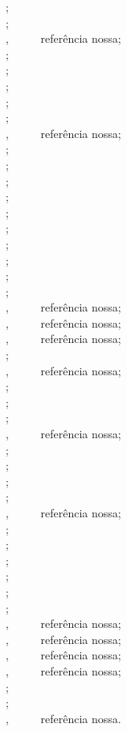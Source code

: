 \begin{apendicesenv}
{\small
	\cite{Alcionep1988} ;\\
	\cite{bart1952} ;\\
	\cite{BibTeX2014} , \ \ \ \ \ referência nossa;\\
	\cite{bioline1998} ;\\
	\cite{birds1998} ;\\
	\cite{cassiano1998} ;\\
	\cite{ceravi1985} ;\\
	\cite{coordena1995} ;\\
	\cite{CTAN2014} , \ \ \ \ \ referência nossa;\\
	\cite{datum1996} ;\\
	\cite{delosmar1997} ;\\
	\cite{drummond1998} ;\\
	\cite{duchamp1918} ;\\
	\cite{espaciais1987} ;\\
	\cite{europa0000} ;\\
	\cite{fagner1988} ;\\
	\cite{gallet1851} ;\\
	\cite{globo1995} ;\\
	\cite{indias0000} ;\\
	\cite{IRL2014} , \ \ \ \ \ referência nossa;\\
	\cite{JabRef2014} , \ \ \ \ \ referência nossa;\\
	\cite{Kile2014} , \ \ \ \ \ referência nossa;\\
	\cite{kobayashi1998} ;\\
	\cite{LaTeX2014} , \ \ \ \ \ referência nossa;\\
	\cite{levi1997} ;\\
	\cite{marinho1995} ;\\
	\cite{mattos1987} ;\\
	\cite{Mendeley2014} , \ \ \ \ \ referência nossa;\\
	\cite{microsoft1995} ;\\
	\cite{mpc1993} ;\\
	\cite{parana1997} ;\\
	\cite{parana1998} ;\\
	\cite{Queiroz2014} , \ \ \ \ \ referência nossa;\\
	\cite{samu1977} ;\\
	\cite{silva1991} ;\\
	\cite{simone1977} ;\\
	\cite{sony1990} ;\\
	\cite{brasil1966} ;\\
	\cite{souza1985} ;\\
	\cite{TeX-Br2014} , \ \ \ \ \ referência nossa;\\
	\cite{TeXLive2014} , \ \ \ \ \ referência nossa;\\
	\cite{TeXnicCenter2014} , \ \ \ \ \ referência nossa;\\
	\cite{TeXstudio2014} , \ \ \ \ \ referência nossa;\\
	\cite{vaso1999} ;\\
	\cite{villa1916} ;\\
	\cite{Wikibooks2014} , \ \ \ \ \ referência nossa.\\
}



\end{apendicesenv}

